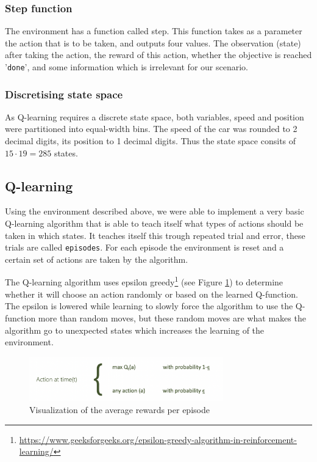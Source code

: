 \documentclass{article}
\begin{document}
\subsubsection{Step function}
The environment has a function called step. This function takes as a parameter the action that is to be taken, and outputs four values. The observation (state) after taking the action, the reward of this action, whether the objective is reached '\texttt{done}', and some information which is irrelevant for our scenario. 

\subsubsection{Discretising state space}
As Q-learning requires a discrete state space, both variables, speed and position were partitioned into equal-width bins. The speed of the car was rounded to 2 decimal digits, its position to 1 decimal digits. Thus the state space consits of $15 \cdot 19 = 285$ states.

\subsection{Q-learning}
Using the environment described above, we were able to implement a very basic Q-learning algorithm that is able to teach itself what types of actions should be taken in which states. 
It teaches itself this trough repeated trial and error, these trials are called \texttt{episodes}. For each episode the environment is reset and a certain set of actions are taken by the algorithm. 

The Q-learning algorithm uses epsilon greedy\footnote{\url{https://www.geeksforgeeks.org/epsilon-greedy-algorithm-in-reinforcement-learning/} } (see Figure \ref{fig:epsilon}) to determine whether it will choose an action randomly or based on the learned Q-function. The epsilon is lowered while learning to slowly force the algorithm to use the Q-function more than random moves, but these random moves are what makes the algorithm go to unexpected states which increases the learning of the environment. 

\begin{figure}[h!]
    \centering
    \includegraphics[width=0.75\textwidth]{Epsilon_greedy.png}
    \caption{Visualization of the average rewards per episode}
    \label{fig:epsilon}
\end{figure}
\end{document}

